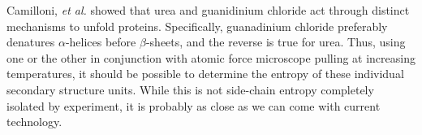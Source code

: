 Camilloni, \emph{et al.} showed that urea and guanidinium chloride act through distinct mechanisms to unfold proteins\cite{Camilloni:2008p276}. Specifically, guanadinium chloride preferably denatures $\alpha$-helices before $\beta$-sheets, and the reverse is true for urea. Thus, using one or the other in conjunction with atomic force microscope pulling at increasing temperatures, it should be possible to determine the entropy of these individual secondary structure units. While this is not side-chain entropy completely isolated by experiment, it is probably as close as we can come with current technology.